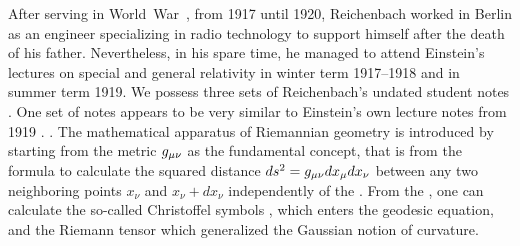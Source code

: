\documentclass[draft]{article}
\newcommand{\xdx}{\ensuremath{x_\nu} and \ensuremath{x_\nu + dx_\nu}\xspace}
\begin{document}

After serving in World~War~, from 1917 until 1920, Reichenbach worked in Berlin as an engineer specializing in radio technology to support himself after the death of his father. Nevertheless, in his spare time, he managed to attend Einstein's lectures on special and general relativity in winter term 1917--1918 and in summer term 1919. We possess three sets of Reichenbach's undated student notes \citep[028-01-04, 028-01-03, 028-01-01]{HR}. One set of notes \citep[028-01-01]{HR} appears to be very similar to Einstein's own lecture notes from 1919 \citep{Einstein1919c}. . The mathematical apparatus of Riemannian geometry is introduced by starting from the metric $g_{\mu\nu}$ as the fundamental concept, that is from the formula to calculate the squared distance $ds^2=g_{\mu\nu} dx_\mu dx_\nu$ between any two neighboring points \xdx independently of the \cs. From the \gmn, one can calculate the so-called Christoffel symbols \christoffel{\mu}{\nu}{\tau}, which enters the geodesic equation, and the Riemann tensor \rite which generalized the Gaussian notion of curvature. 
\end{document}
